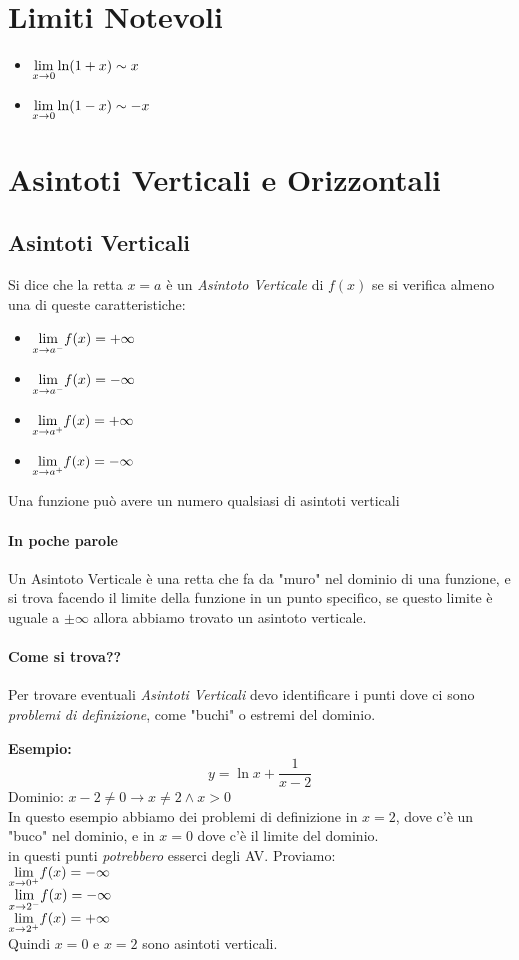 \documentclass[12pt, a4paper, openany]{book}
\newcommand{\esempio}[1]{\begin{box_esempio} \textbf{Esempio: }#1\end{box_esempio}}
\newcommand{\definizione}[1]{\begin{box_definizione} #1 \end{box_definizione}}
\begin{document}
\section{Limiti Notevoli}
\begin{itemize}
    \item $\underset{x \to 0}{\lim} \ln(1+x) \sim x$
    \item $\underset{x \to 0}{\lim} \ln(1-x) \sim -x$
\end{itemize}

\section{Asintoti Verticali e Orizzontali}
\subsection*{Asintoti Verticali}
\definizione{
    Si dice che la retta $x=a$ è un \emph{Asintoto Verticale} di $f(x)$ se si verifica almeno una di queste caratteristiche:
    \begin{itemize}
        \item $\underset{x \to a^-}{\lim} f(x)= +\infty$
        \item $\underset{x \to a^-}{\lim} f(x)= -\infty$
        \item $\underset{x \to a^+}{\lim} f(x)= +\infty$
        \item $\underset{x \to a^+}{\lim} f(x)= -\infty$
    \end{itemize}
    Una funzione può avere un numero qualsiasi di asintoti verticali
}
\paragraph*{In poche parole} Un Asintoto Verticale è una retta che fa da "muro" nel dominio di una funzione, e si trova facendo il limite della funzione in un punto specifico, se questo limite è uguale a $\pm \infty$ allora abbiamo trovato un asintoto verticale.

\paragraph*{Come si trova??} Per trovare eventuali \emph{Asintoti Verticali} devo identificare i punti dove ci sono \emph{problemi di definizione},
come "buchi" o estremi del dominio.

\esempio{
    $$y = \ln x + \frac{1}{x-2}$$
    Dominio: $x-2 \neq 0 \rightarrow x\neq 2 \wedge x>0$
    \\In questo esempio abbiamo dei problemi di definizione in $x=2$, dove c'è un "buco" nel dominio, e in $x=0$ dove c'è il limite del dominio.
    \\in questi punti \emph{potrebbero} esserci degli AV. Proviamo:
    \\$\underset{x \to 0^+}{\lim} f(x)= -\infty$
    \\$\underset{x \to 2^-}{\lim} f(x)= -\infty$
    \\$\underset{x \to 2^+}{\lim} f(x)= +\infty$
    \\Quindi $x=0$ e $x=2$ sono asintoti verticali.
} 
\end{document}
